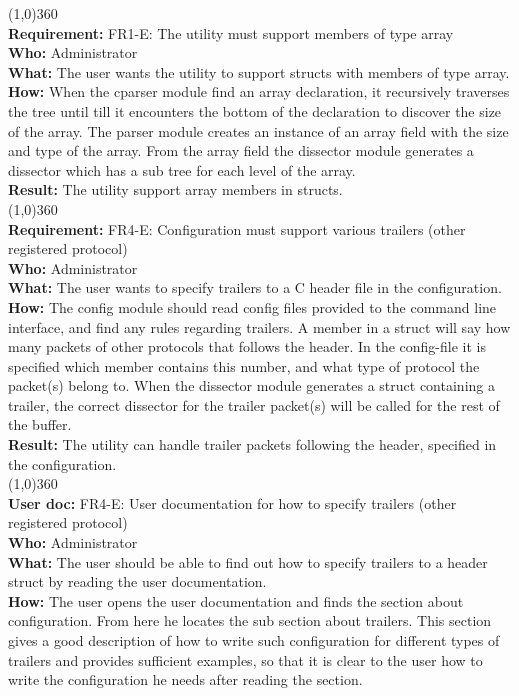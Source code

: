\line(1,0){360}\\
\textbf{Requirement:} FR1-E: The utility must support members of type array\\
\textbf{Who:} Administrator\\
\textbf{What:} The user wants the utility to support structs with members of type array.\\
\textbf{How:} When the cparser module find an array declaration, it recursively traverses the tree until till it encounters the bottom of the declaration to discover the size of the array. The parser module creates an instance of an array field with the size and type of the array. From the array field the dissector module generates a dissector which has a sub tree for each level of the array.\\
\textbf{Result:} The utility support array members in structs.\\
\line(1,0){360}\\
\textbf{Requirement:} FR4-E: Configuration must support various trailers (other registered protocol)\\
\textbf{Who:} Administrator\\ 
\textbf{What:} The user wants to specify trailers to a C header file in the configuration.\\
\textbf{How:} The config module should read config files provided to the command line interface, and find any rules regarding trailers. A member in a struct will say how many packets of other protocols that follows the header. In the config-file it is specified which member contains this number, and what type of protocol the packet(s) belong to. When the dissector module generates a struct containing a trailer, the correct dissector for the trailer packet(s) will be called for the rest of the buffer.\\
\textbf{Result:} The utility can handle trailer packets following the header, specified in the configuration.\\
\line(1,0){360}\\
\textbf{User doc:} FR4-E: User documentation for how to specify trailers (other registered protocol)\\
\textbf{Who:} Administrator\\
\textbf{What:} The user should be able to find out how to specify trailers to a header struct by reading the user documentation.\\
\textbf{How:} The user opens the user documentation and finds the section about configuration. From here he locates the sub section about trailers. This section gives a good description of how to write such configuration for different types of trailers and provides sufficient examples, so that it is  clear to the user how to write the configuration he needs after reading the section.\\
